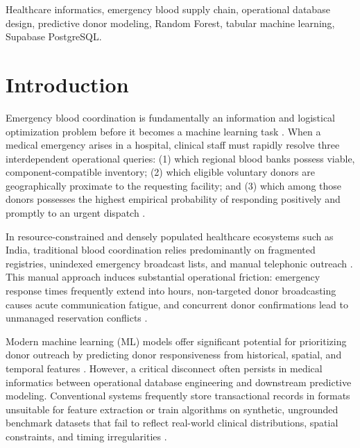 \documentclass[conference]{IEEEtran}
\begin{document}
\begin{IEEEkeywords}
Healthcare informatics, emergency blood supply chain, operational database design, predictive donor modeling, Random Forest, tabular machine learning, Supabase PostgreSQL.
\end{IEEEkeywords}

\section{Introduction}
Emergency blood coordination is fundamentally an information and logistical optimization problem before it becomes a machine learning task \cite{belien2012supply}. When a medical emergency arises in a hospital, clinical staff must rapidly resolve three interdependent operational queries: (1) which regional blood banks possess viable, component-compatible inventory; (2) which eligible voluntary donors are geographically proximate to the requesting facility; and (3) which among those donors possesses the highest empirical probability of responding positively and promptly to an urgent dispatch \cite{shringi2020blood}. 

In resource-constrained and densely populated healthcare ecosystems such as India, traditional blood coordination relies predominantly on fragmented registries, unindexed emergency broadcast lists, and manual telephonic outreach \cite{agarwal2012blood, gemawat2021blood}. This manual approach induces substantial operational friction: emergency response times frequently extend into hours, non-targeted donor broadcasting causes acute communication fatigue, and concurrent donor confirmations lead to unmanaged reservation conflicts \cite{laermans2022use}. 

Modern machine learning (ML) models offer significant potential for prioritizing donor outreach by predicting donor responsiveness from historical, spatial, and temporal features \cite{kauten2022predicting, yeh2024prediction}. However, a critical disconnect often persists in medical informatics between operational database engineering and downstream predictive modeling. Conventional systems frequently store transactional records in formats unsuitable for feature extraction or train algorithms on synthetic, ungrounded benchmark datasets that fail to reflect real-world clinical distributions, spatial constraints, and timing irregularities \cite{walonoski2018synthea, choi2017medgan}.
\end{document}
